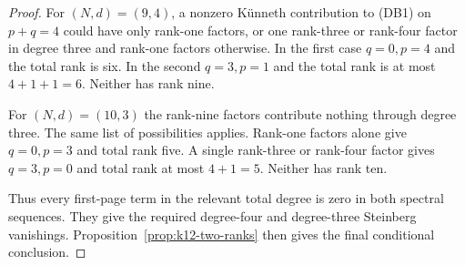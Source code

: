 \begin{proof}
For $(N,d)=(9,4)$, a nonzero K\"unneth contribution to
\textup{(DB1)} on $p+q=4$ could have only rank-one factors,
or one rank-three or rank-four factor in degree three and rank-one
factors otherwise. In the first case $q=0,p=4$ and the total rank
is six. In the second $q=3,p=1$ and the total rank is at most
$4+1+1=6$. Neither has rank nine.

For $(N,d)=(10,3)$ the rank-nine factors contribute nothing through
degree three. The same list of possibilities applies. Rank-one
factors alone give $q=0,p=3$ and total rank five. A single
rank-three or rank-four factor gives $q=3,p=0$ and total rank at
most $4+1=5$. Neither has rank ten.

Thus every first-page term in the relevant total degree is zero in
both spectral sequences. They give the required degree-four and
degree-three Steinberg vanishings. Proposition~\ref{prop:k12-two-ranks}
then gives the final conditional conclusion.
\end{proof}
